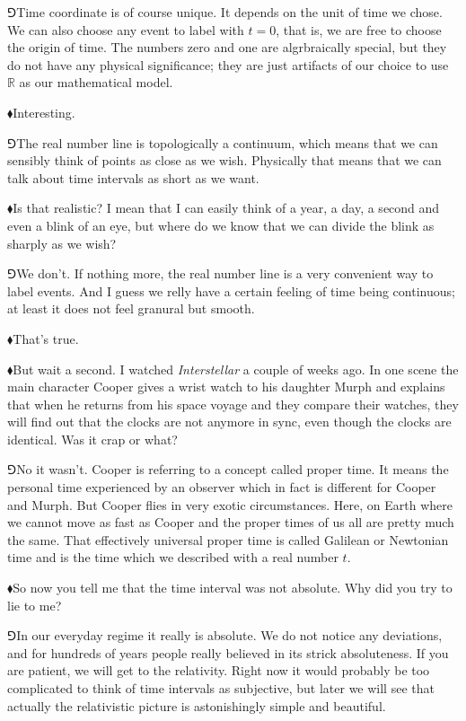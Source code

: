 \documentclass[11pt,oneside%
]{memoir}
\newcommand{\hea}{\(\blacklozenge\)\;}
\newcommand{\heb}{\(\Game\)\;}
\begin{document}
\heb Time coordinate is of course unique. It depends on the unit of time we chose. We can also choose any event to label with \(t=0\), that is, we are free to choose the origin of time. The numbers zero and one are algrbraically special, but they do not have any physical significance; they are just artifacts of our choice to use \(\mathbb{R}\) as our mathematical model.

\hea Interesting.

\heb The real number line is topologically a continuum, which means that we can sensibly think of points as close as we wish. Physically that means that we can talk about time intervals as short as we want.

\hea Is that realistic? I mean that I can easily think of a year, a day, a second and even a blink of an eye, but where do we know that we can divide the blink as sharply as we wish?

\heb We don't. If nothing more, the real number line is a very convenient way to label events. And I guess we relly have a certain feeling of time being continuous; at least it does not feel granural but smooth.

\hea That's true.

\hea But wait a second. I watched \emph{Interstellar} a couple of weeks ago. In one scene the main character Cooper gives a wrist watch to his daughter Murph and explains that when he returns from his space voyage and they compare their watches, they will find out that the clocks are not anymore in sync, even though the clocks are identical. Was it crap or what?

\heb No it wasn't. Cooper is referring to a concept called proper time. It means the personal time experienced by an observer which in fact is different for Cooper and Murph. But Cooper flies in very exotic circumstances. Here, on Earth where we cannot move as fast as Cooper and the proper times of us all are pretty much the same. That effectively universal proper time is called Galilean or Newtonian time and is the time which we described with a real number \(t\).

\hea So now you tell me that the time interval was not absolute. Why did you try to lie to me?

\heb In our everyday regime it really is absolute. We do not notice any deviations, and for hundreds of years people really believed in its strick absoluteness. If you are patient, we will get to the relativity. Right now it would probably be too complicated to think of time intervals as subjective, but later we will see that actually the relativistic picture is astonishingly simple and beautiful.
\end{document}
